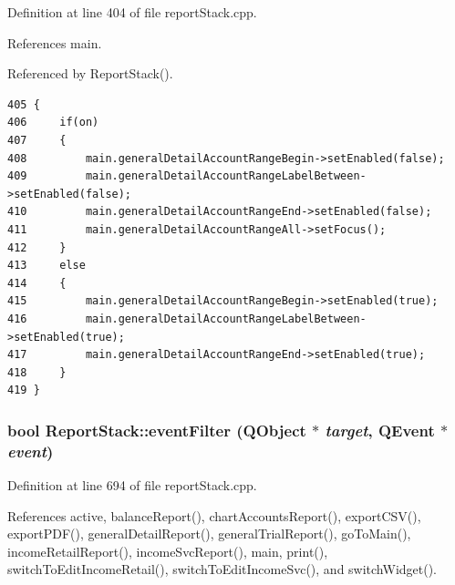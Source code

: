Definition at line 404 of file report\-Stack.cpp.

References main.

Referenced by Report\-Stack().

\footnotesize\begin{verbatim}405 {
406     if(on)
407     {
408         main.generalDetailAccountRangeBegin->setEnabled(false);
409         main.generalDetailAccountRangeLabelBetween->setEnabled(false);
410         main.generalDetailAccountRangeEnd->setEnabled(false);
411         main.generalDetailAccountRangeAll->setFocus();
412     }
413     else
414     {
415         main.generalDetailAccountRangeBegin->setEnabled(true);
416         main.generalDetailAccountRangeLabelBetween->setEnabled(true);
417         main.generalDetailAccountRangeEnd->setEnabled(true);
418     }
419 } 
\end{verbatim}\normalsize 


\hypertarget{classReportStack_d0}{
\subsubsection[eventFilter]{\setlength{\rightskip}{0pt plus 5cm}bool Report\-Stack::event\-Filter (QObject $\ast$ {\em target}, QEvent $\ast$ {\em event})}}
\label{classReportStack_d0}


Definition at line 694 of file report\-Stack.cpp.

References active, balance\-Report(), chart\-Accounts\-Report(), export\-CSV(), export\-PDF(), general\-Detail\-Report(), general\-Trial\-Report(), go\-To\-Main(), income\-Retail\-Report(), income\-Svc\-Report(), main, print(), switch\-To\-Edit\-Income\-Retail(), switch\-To\-Edit\-Income\-Svc(), and switch\-Widget().

